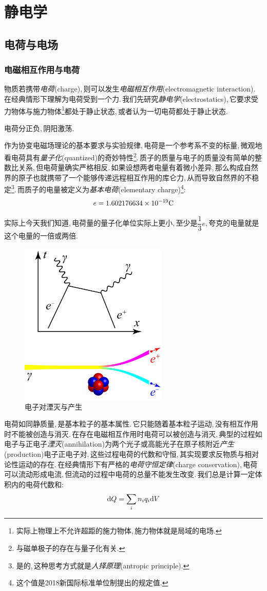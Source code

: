\chapter{静电学}


\section{电荷与电场}

\subsection{电磁相互作用与电荷}
物质若携带\emph{电荷}(charge),\,则可以发生\emph{电磁相互作用}(electromagnetic interaction).\,在经典情形下理解为电荷受到一个力.\,我们先研究\emph{静电学}(electrostatics),\,它要求受力物体与施力物体\footnote{实际上物理上不允许超距的施力物体,\,施力物体就是局域的电场.}都处于静止状态,\,或者认为一切电荷都处于静止状态.

电荷分正负,\,阴阳激荡.

作为协变电磁场理论的基本要求与实验规律,\,电荷是一个参考系不变的标量,\,微观地看电荷具有\emph{量子化}(quantized)的奇妙特性\footnote{与磁单极子的存在与量子化有关.}.\,质子的质量与电子的质量没有简单的整数比关系,\,但电荷量确实严格相反.\,如果设想两者电量有着微小差异,\,那么构成自然界的原子也就携带了一个能够传递远程相互作用的库仑力,\,从而导致自然界的不稳定\footnote{是的,\,这种思考方式就是\emph{人择原理}(antropic principle).}.\,而质子的电量被定义为\emph{基本电荷}(elementary charge)\footnote{这个值是2018新国际标准单位制提出的规定值.}:
\[e=1.602176634\times 10^{-19} {\rm C}\]

实际上今天我们知道,\,电荷量的量子化单位实际上更小,\,至少是\(\dfrac{1}{3}e\),\,夸克的电量就是这个电量的一倍或两倍.

\begin{figure}
\centering
\includegraphics[width=7cm]{image/7-1-1.png}
\caption{电子对湮灭与产生}
\end{figure}
电荷如同静质量,\,是基本粒子的基本属性.\,它只能随着基本粒子运动,\,没有相互作用时不能被创造与消灭.\,在存在电磁相互作用时电荷可以被创造与消灭,\,典型的过程如电子与正电子\emph{湮灭}(annihilation)为两个光子或高能光子在原子核附近\emph{产生}(production)电子正电子对.\,这些过程电荷的代数和守恒,\,其实现要求反物质与相对论性运动的存在.\,在经典情形下有严格的\emph{电荷守恒定律}(charge conservation),\,电荷可以流动形成电流,\,但流动的过程中电荷的总量不能发生改变.\,我们总是计算一定体积内的电荷代数和:
\[\textrm{d} Q=\sum_i{n_i q_i}\textrm{d} V\]

